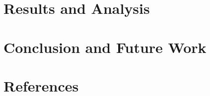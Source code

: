 \documentclass[a4paper]{article}
\begin{document}
\begin{multicols}{2}

\section{Results and Analysis}
\section{Conclusion and Future Work}

\section{References}

\end{multicols}
\end{document}
